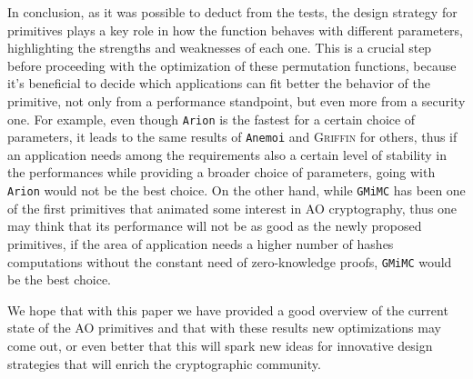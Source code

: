 \documentclass[12pt, a4paper]{report}
\begin{document}
In conclusion, as it was possible to deduct from the tests, the design strategy for primitives plays a key role in how the function behaves with different parameters, highlighting the strengths and weaknesses of each one.
This is a crucial step before proceeding with the optimization of these permutation functions, because it's beneficial to decide which applications can fit better the behavior of the primitive, not only from a performance standpoint, but even more from a security one.
For example, even though \texttt{Arion} is the fastest for a certain choice of parameters, it leads to the same results of \texttt{Anemoi} and \textsc{Griffin} for others, thus if an application needs among the requirements also a certain level of stability in the performances while providing a broader choice of parameters, going with \texttt{Arion} would not be the best choice.
On the other hand, while \texttt{GMiMC} has been one of the first primitives that animated some interest in AO cryptography, thus one may think that its performance will not be as good as the newly proposed primitives, if the area of application needs a higher number of hashes computations without the constant need of zero-knowledge proofs, \texttt{GMiMC} would be the best choice.

We hope that with this paper we have provided a good overview of the current state of the AO primitives and that with these results new optimizations may come out, or even better that this will spark new ideas for innovative design strategies that will enrich the cryptographic community.

\nocite{*}
\printbibliography[heading=bibnumbered,title={References}]
\end{document}
